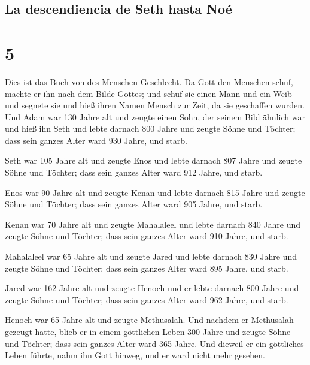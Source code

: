 \hypertarget{la-descendiencia-de-seth-hasta-nouxe9}{%
\subsection{La descendiencia de Seth hasta
Noé}\label{la-descendiencia-de-seth-hasta-nouxe9}}

\hypertarget{section-4}{%
\section{5}\label{section-4}}

 Dies ist das Buch von des Menschen Geschlecht. Da Gott
den Menschen schuf, machte er ihn nach dem Bilde Gottes; 
und schuf sie einen Mann und ein Weib und segnete sie und hieß ihren
Namen Mensch zur Zeit, da sie geschaffen wurden.  Und Adam
war 130 Jahre alt und zeugte einen Sohn, der seinem Bild ähnlich war und
hieß ihn Seth  und lebte darnach 800 Jahre und zeugte
Söhne und Töchter;  dass sein ganzes Alter ward 930 Jahre,
und starb.

 Seth war 105 Jahre alt und zeugte Enos  und
lebte darnach 807 Jahre und zeugte Söhne und Töchter; 
dass sein ganzes Alter ward 912 Jahre, und starb.

 Enos war 90 Jahre alt und zeugte Kenan 
und lebte darnach 815 Jahre und zeugte Söhne und Töchter;
 dass sein ganzes Alter ward 905 Jahre, und starb.

 Kenan war 70 Jahre alt und zeugte Mahalaleel
 und lebte darnach 840 Jahre und zeugte Söhne und
Töchter;  dass sein ganzes Alter ward 910 Jahre, und
starb.

 Mahalaleel war 65 Jahre alt und zeugte Jared
 und lebte darnach 830 Jahre und zeugte Söhne und
Töchter;  dass sein ganzes Alter ward 895 Jahre, und
starb.

 Jared war 162 Jahre alt und zeugte Henoch
 und er lebte darnach 800 Jahre und zeugte Söhne und
Töchter;  dass sein ganzes Alter ward 962 Jahre, und
starb.

 Henoch war 65 Jahre alt und zeugte Methusalah.
 Und nachdem er Methusalah gezeugt hatte, blieb er in
einem göttlichen Leben 300 Jahre und zeugte Söhne und Töchter;
 dass sein ganzes Alter ward 365 Jahre. 
Und dieweil er ein göttliches Leben führte, nahm ihn Gott hinweg, und er
ward nicht mehr gesehen.

